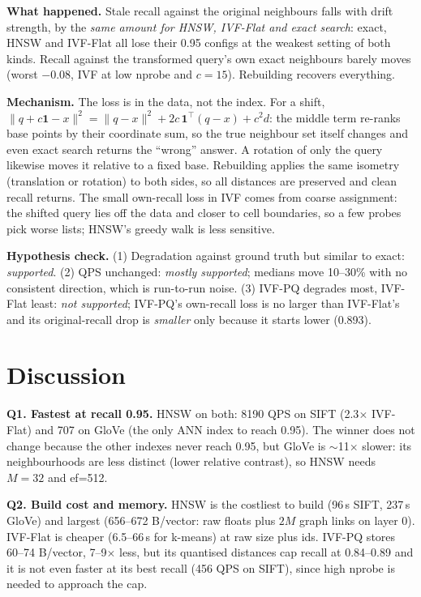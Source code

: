 \documentclass[10pt,a4paper]{article}
\begin{document}
\textbf{What happened.} Stale recall against the original neighbours falls with drift strength,
by the \emph{same amount for HNSW, IVF-Flat and exact search}: exact, HNSW and IVF-Flat all lose
their 0.95 configs at the weakest setting of both kinds. Recall against the transformed query's
own exact neighbours barely moves (worst $-0.08$, IVF at low nprobe and $c=15$). Rebuilding
recovers everything.

\textbf{Mechanism.} The loss is in the data, not the index. For a shift,
$\lVert q+c\mathbf{1}-x\rVert^2=\lVert q-x\rVert^2+2c\,\mathbf{1}^\top(q-x)+c^2d$: the middle term
re-ranks base points by their coordinate sum, so the true neighbour set itself changes and even
exact search returns the ``wrong'' answer. A rotation of only the query likewise moves it
relative to a fixed base. Rebuilding applies the same isometry (translation or rotation) to both
sides, so all distances are preserved and clean recall returns. The small own-recall loss in IVF
comes from coarse assignment: the shifted query lies off the data and closer to cell boundaries,
so a few probes pick worse lists; HNSW's greedy walk is less sensitive.

\textbf{Hypothesis check.} (1) Degradation against ground truth but similar to exact:
\emph{supported}. (2) QPS unchanged: \emph{mostly supported}; medians move 10--30\% with no
consistent direction, which is run-to-run noise. (3) IVF-PQ degrades most, IVF-Flat least:
\emph{not supported}; IVF-PQ's own-recall loss is no larger than IVF-Flat's and its
original-recall drop is \emph{smaller} only because it starts lower (0.893).

\section{Discussion}
\textbf{Q1. Fastest at recall 0.95.} HNSW on both: 8190 QPS on SIFT (2.3$\times$ IVF-Flat) and
707 on GloVe (the only ANN index to reach 0.95). The winner does not change because the other indexes never reach 0.95, but GloVe is
$\sim$11$\times$ slower: its neighbourhoods are less distinct (lower relative contrast), so HNSW
needs $M=32$ and ef=512.

\textbf{Q2. Build cost and memory.} HNSW is the costliest to build (96\,s SIFT, 237\,s GloVe)
and largest (656--672 B/vector: raw floats plus $2M$ graph links on layer 0). IVF-Flat is
cheaper (6.5--66\,s for k-means) at raw size plus ids. IVF-PQ stores 60--74 B/vector,
7--9$\times$ less, but its quantised distances cap recall at 0.84--0.89 and it is not even faster
at its best recall (456 QPS on SIFT), since high nprobe is needed to approach the cap.
\end{document}

